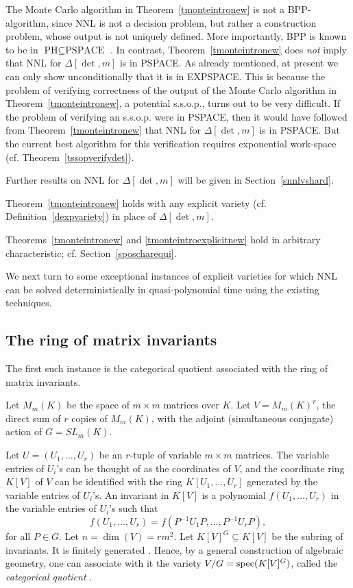 \documentclass[11pt]{article}
\begin{document}
The Monte Carlo algorithm in Theorem~\ref{tmonteintronew} is not a BPP-algorithm, 
since NNL is not a decision problem, but rather a construction problem, whose output
is not uniquely defined. More importantly, BPP is known to be in $\mbox{PH} \subseteq \mbox{PSPACE}$ \cite{arora}. In contrast, Theorem~\ref{tmonteintronew}
does {\em not} imply that NNL for $\Delta[\det,m]$ is in PSPACE. 
As already mentioned, at present we can only show unconditionally that it is in EXPSPACE.
This is because the problem of verifying correctness of  the output 
of the Monte Carlo algorithm in Theorem~\ref{tmonteintronew}, a potential s.s.o.p.,
turns out to be very difficult. If the problem of verifying an s.s.o.p.  were in PSPACE, then it would have followed
from Theorem~\ref{tmonteintronew} that NNL for $\Delta[\det,m]$ is in PSPACE.
But the current best algorithm for this verification  requires exponential work-space (cf. Theorem~\ref{tssopverifydet}). 

Further results on NNL for $\Delta[\det,m]$ will be given in Section~\ref{snnlvshard}.


\begin{theorem} \label{tmonteintroexplicitnew}
Theorem~\ref{tmonteintronew} holds with any explicit variety (cf. Definition~\ref{dexpvariety})
in place of $\Delta[\det,m]$.
\end{theorem}


Theorems~\ref{tmonteintronew} and \ref{tmonteintroexplicitnew} hold in arbitrary characteristic;  cf. Section~\ref{sposcharequi}.

We next turn  to some exceptional instances of  explicit varieties for which NNL can be 
solved deterministically in quasi-polynomial time using the existing techniques.

\subsection{The ring of matrix invariants} \label{snnlmatrixnew}
The  first  such instance   is the categorical quotient \cite{mumford} 
associated with the ring of matrix invariants.

Let $M_m(K)$ be the space of $m\times m$ matrices over $K$. Let
$V=M_m(K)^r$, the direct sum of $r$ copies of $M_m(K)$, with the adjoint (simultaneous conjugate)
action of $G=SL_m(K)$.

Let $U=(U_1,\ldots,U_r)$ be an $r$-tuple  of variable $m\times m$ matrices. 
The variable entries of $U_i$'s can be thought of as the coordinates of
$V$, and  the coordinate ring $K[V]$ of $V$ can be identified with
the ring $K[U_1,\ldots,U_r]$ generated by the variable entries of $U_i$'s. 
An invariant in  $K[V]$ is  a polynomial $f(U_1,\ldots,U_r)$ in the variable entries of $U_i$'s such that
\[ f(U_1,\ldots,U_r)=f(P^{-1} U_1 P,\ldots, P^{-1} U_r P),\] 
for all $P \in G$. Let $n=\dim(V)= r m^2$.
Let $K[V]^G \subseteq K[V]$ be the subring of  invariants. It is  finitely generated \cite{hilbert,procesimatrix}.
Hence, by a general construction of algebraic geometry,  one can associate with it  the variety  $V/G={\mbox {spec}}(K[V]^G)$,
called the {\em categorical quotient} \cite{mumford}.  
\end{document}
